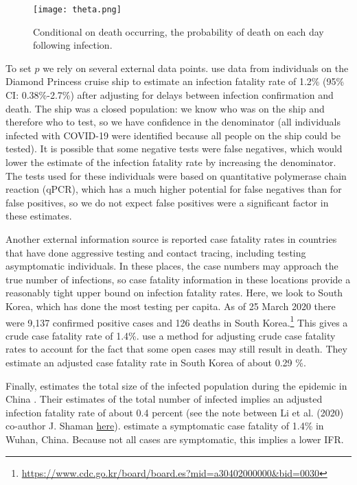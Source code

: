 \documentclass[11pt]{article}
\theoremstyle{plain}
\newcommand{\1}{\mathbf 1}
\begin{document}
\begin{figure}[h]
\centering
\texttt{[image: theta.png]}
\caption{\label{fig:time-to-death} Conditional on death occurring, the probability of death on each day following infection.}
\end{figure}

To set $p$ we rely on several external data points. \citet{russell2020estimating} use data from individuals on the Diamond Princess cruise ship to estimate an infection fatality rate of 1.2\% (95\% CI: 0.38\%-2.7\%) after adjusting for delays between infection confirmation and death. The ship was a closed population: we know who was on the ship and therefore who to test, so we have confidence in the denominator (all individuals infected with COVID-19 were identified because all people on the ship could be tested). It is possible that some negative tests were false negatives, which would lower the estimate of the infection fatality rate by increasing the denominator. The tests used for these individuals were based on quantitative polymerase chain reaction (qPCR), which has a much higher potential for false negatives than for false positives, so we do not expect false positives were a significant factor in these estimates.

Another external information source is reported case fatality rates in countries that have done aggressive testing and contact tracing, including testing asymptomatic individuals. In these places, the case numbers may approach the true number of infections, so case fatality information in these locations provide a reasonably tight upper bound on infection fatality rates. Here, we look to South Korea, which has done the most testing per capita. As of 25 March 2020 there were 9,137 confirmed positive cases and 126 deaths in South Korea.\footnote{\url{https://www.cdc.go.kr/board/board.es?mid=a30402000000&bid=0030}} This gives a crude case fatality rate of 1.4\%. \cite{JordanCFR} use  a method for adjusting crude case fatality rates to account for the fact that some open cases may still result in death. They estimate an adjusted case fatality rate in South Korea of about 0.29 \%. 

Finally, \citep{li2020substantial} estimates the total size of the infected population during the epidemic in China . Their estimates of the total number of infected implies an adjusted infection fatality rate of about 0.4 percent (see the note between Li et al. (2020) co-author J. Shaman \href{https://statmodeling.stat.columbia.edu/2020/03/07/coronavirus-age-specific-fatality-ratio-estimated-using-stan/}{here}). \cite{wu2020estimating} estimate a symptomatic case fatality of 1.4\% in Wuhan, China. Because not all cases are symptomatic, this implies a lower IFR. 
\end{document}
